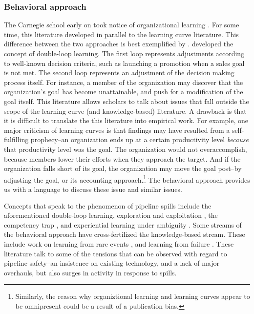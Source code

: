 

\subsubsection{Behavioral approach}

The Carnegie school early on took notice of organizational learning \citep[e.g., ][]{March1963}. For some time, this literature developed in parallel to the learning curve literature. This difference between the two approaches is best exemplified by \citet{Argyris1978}. \citet{Argyris1978} developed the concept of double-loop learning. The first loop represents adjustments according to well-known decision criteria, such as launching a promotion when a sales goal is not met. The second loop represents an adjustment of the decision making process itself. For instance, a member of the organization may discover that the organization's goal has become unattainable, and push for a modification of the goal itself. This literature allows scholars to talk about issues that fall outside the scope of the learning curve (and knowledge-based) literature. A drawback is that it is difficult to translate the this literature into empirical work. For example, one major criticism of learning curves is that findings may have resulted from a self-fulfilling prophecy--an organization ends up at a certain productivity level \textit{because} that productivity level was the goal. The organization would not overaccomplish, because members lower their efforts when they approach the target. And if the organization falls short of its goal, the organization may move the goal post--by adjusting the goal, or its accounting approach.\footnote{Similarly, the reason why organiztional learning and learning curves appear to be omnipresent could be a result of a publication bias.} The behavioral approach provides us with a language to discuss these issue and similar issues. 

Concepts that speak to the phenomenon of pipeline spills include the aforementioned double-loop learning, exploration and exploitation \citep{March1991}, the competency trap \citep{Levitt1988}, and experiential learning under ambiguity \citep{March1975}. Some streams of the behavioral approach have cross-fertilized the knowledge-based stream. These include work on learning from rare events \citep{March1991b, Maslach2018}, and learning from failure \citep[e.g.,][]{Madsen2010}. These literature talk to some of the tensions that can be observed with regard to pipeline safety--an insistence on existing technology, and a lack of major overhauls, but also surges in activity in response to spills.

